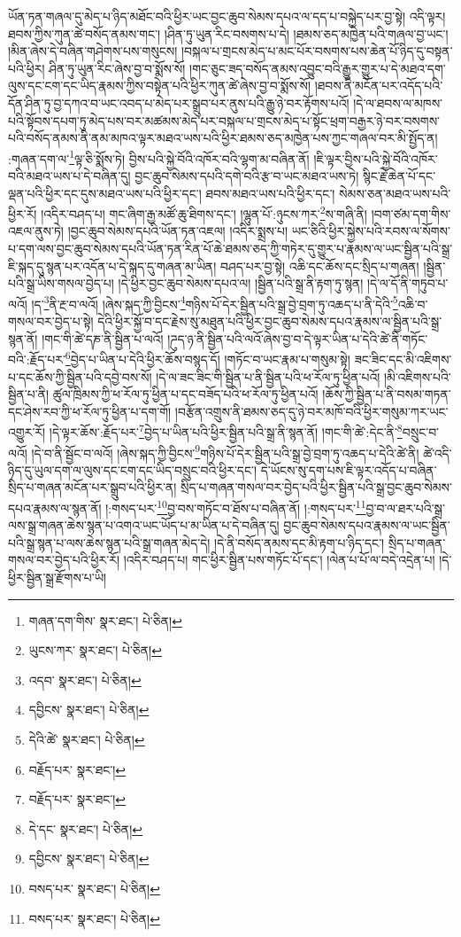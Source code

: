 ཡོན་ཏན་གཞལ་དུ་མེད་པ་ཉིད་མཐོང་བའི་ཕྱིར་ཡང་བྱང་ཆུབ་སེམས་དཔའ་ལ་དད་པ་བསྐྱེད་པར་བྱ་སྟེ། འདི་ལྟར། ཐབས་ཀྱིས་ཀུན་ཚེ་བསོད་ནམས་གང་། །ཤིན་ཏུ་ཡུན་རིང་བསགས་པ་དེ། །ཐམས་ཅད་མཁྱེན་པའི་གཞལ་བྱ་ཡང་། །མིན་ཞེས་དེ་བཞིན་གཤེགས་པས་གསུངས། །བསྐལ་པ་གྲངས་མེད་པ་མང་པོར་བསགས་པས་ཆེན་པོ་ཉིད་དུ་བསྟན་པའི་ཕྱིར། ཤིན་ཏུ་ཡུན་རིང་ཞེས་བྱ་བ་སྨོས་སོ། །གང་ཅུང་ཟད་བསོད་ནམས་འབྱུང་བའི་རྒྱུར་གྱུར་པ་དེ་མཐའ་དག་ལུས་དང་ངག་དང་ཡིད་རྣམས་ཀྱིས་བསྟེན་པའི་ཕྱིར་ཀུན་ཚེ་ཞེས་བྱ་བ་སྨོས་སོ། །ཐབས་ནི་མངོན་པར་འདོད་པའི་དོན་ཤིན་ཏུ་བྱ་དཀའ་བ་ཡང་འབད་པ་མེད་པར་སྒྲུབ་པར་ནུས་པའི་རྒྱུ་ཉེ་བར་རྟོགས་པའོ། །དེ་ལ་ཐབས་ལ་མཁས་པའི་སྟོབས་དཔག་ཏུ་མེད་པས་བར་མཚམས་མེད་པར་བསྐལ་པ་གྲངས་མེད་པ་སྟོང་ཕྲག་བརྒྱར་ཉེ་བར་བསགས་པའི་བསོད་ནམས་ནི་ནམ་མཁའ་ལྟར་མཐའ་ཡས་པའི་ཕྱིར་ཐམས་ཅད་མཁྱེན་པས་ཀྱང་གཞལ་བར་མི་སྤྱོད་ན། :གཞན་དག་ལ་\footnote{གཞན་དག་གིས་  སྣར་ཐང་།  པེ་ཅིན། }ལྟ་ཅི་སྨོས་ཏེ། བྱིས་པའི་སྐྱེ་བོའི་འཁོར་བའི་ལྷག་མ་བཞིན་ནོ། །ཇི་ལྟར་བྱིས་པའི་སྐྱེ་བོའི་འཁོར་བའི་མཐའ་ཡས་པ་དེ་བཞིན་དུ། བྱང་ཆུབ་སེམས་དཔའི་དགེ་བའི་རྩ་བ་ཡང་མཐའ་ཡས་ཏེ། སྙིང་རྗེ་ཆེན་པོ་དང་ལྡན་པའི་ཕྱིར་དང་དུས་མཐའ་ཡས་པའི་ཕྱིར་དང་། ཐབས་མཐའ་ཡས་པའི་ཕྱིར་དང་། སེམས་ཅན་མཐའ་ཡས་པའི་ཕྱིར་རོ། །འདིར་བཤད་པ། གང་ཞིག་རྒྱ་མཚོ་ཆུ་ཐིགས་དང་། །ལྷུན་པོ་:ཉུངས་ཀར་\footnote{ཡུངས་ཀར་  སྣར་ཐང་།  པེ་ཅིན། }ས་གཞི་ནི། །བག་ཙམ་དག་གིས་འཇལ་ནུས་ཏེ། །བྱང་ཆུབ་སེམས་དཔའི་ཡོན་ཏན་འཇལ། །འདིར་སྨྲས་པ། ཡང་ཅིའི་ཕྱིར་སྐྱེས་པའི་རབས་ལ་སོགས་པ་དག་ལས་བྱང་ཆུབ་སེམས་དཔའི་ཡོན་ཏན་རིན་པོ་ཆེ་ཐམས་ཅད་ཀྱི་གཏེར་དུ་གྱུར་པ་རྣམས་ལ་ཡང་སྦྱིན་པའི་སྒྲ་ཇི་སྐད་དུ་སྙན་པར་འདོན་པ་དེ་སྐད་དུ་གཞན་མ་ཡིན། བཤད་པར་བྱ་སྟེ། འཆི་དང་ཆོས་དང་སྲིད་པ་གཞན། །སྦྱིན་པའི་སྒྲ་ཡིས་གསལ་བྱེད་པ། །དེ་ཕྱིར་བྱང་ཆུབ་སེམས་དཔའ་ལ། །སྦྱིན་པའི་སྒྲ་ནི་རྟག་ཏུ་སྙན། །དེ་ལ་དོ་ནི་གཏུབ་པ་ལའོ། །ད་\footnote{འདབ་  སྣར་ཐང་།  པེ་ཅིན། }ནི་རྔ་བ་ལའོ། །ཞེས་སྐད་ཀྱི་བྱིངས་\footnote{དབྱིངས་  སྣར་ཐང་།  པེ་ཅིན། }གཉིས་པོ་དེར་སྦྱིན་པའི་སྒྲ་བྱེ་བྲག་ཏུ་འཆད་པ་ནི་དེའི་\footnote{དེའི་ཚེ་  སྣར་ཐང་།  པེ་ཅིན། }འཆི་བ་གསལ་བར་བྱེད་པ་སྟེ། དེའི་ཕྱིར་སྐྱོ་བ་དང་རྗེས་སུ་མཐུན་པའི་ཕྱིར་བྱང་ཆུབ་སེམས་དཔའ་རྣམས་ལ་སྦྱིན་པའི་སྒྲ་སྙན་ནོ། །གང་གི་ཚེ་དཎ་ནི་སྦྱིན་པ་ལའོ། །ཌུད་ཉ་ནི་སྦྱིན་པའི་ལའོ་ཞེས་བྱ་བ་དེ་ལྟར་ཡིན་པ་དེའི་ཚེ་ནི་གཏོང་བའི་:རྗོད་པར་\footnote{བརྗོད་པར་  སྣར་ཐང་། }བྱེད་པ་ཡིན་པ་དེའི་ཕྱིར་ཆོས་བསྙད་དོ། །གཏོང་བ་ཡང་རྣམ་པ་གསུམ་སྟེ། ཟང་ཟིང་དང་མི་འཇིགས་པ་དང་ཆོས་ཀྱི་སྦྱིན་པའི་དབྱེ་བས་སོ། །དེ་ལ་ཟང་ཟིང་གི་སྦྱིན་པ་ནི་སྦྱིན་པའི་ཕ་རོལ་ཏུ་ཕྱིན་པའོ། །མི་འཇིགས་པའི་སྦྱིན་པ་ནི། ཚུལ་ཁྲིམས་ཀྱི་ཕ་རོལ་ཏུ་ཕྱིན་པ་དང་བཟོད་པའི་ཕ་རོལ་ཏུ་ཕྱིན་པའོ། །ཆོས་ཀྱི་སྦྱིན་པ་ནི་བསམ་གཏན་དང་ཤེས་རབ་ཀྱི་ཕ་རོལ་ཏུ་ཕྱིན་པ་དག་གོ། །བརྩོན་འགྲུས་ནི་ཐམས་ཅད་དུ་ཉེ་བར་མཁོ་བའི་ཕྱིར་གསུམ་ཀར་ཡང་འགྱུར་རོ། །དེ་ལྟར་ཆོས་:རྗོད་པར་\footnote{བརྗོད་པར་  སྣར་ཐང་། }བྱེད་པ་ཡིན་པའི་ཕྱིར་སྦྱིན་པའི་སྒྲ་ནི་སྙན་ནོ། །གང་གི་ཚེ་:དེང་ནི་\footnote{དེ་དང་  སྣར་ཐང་།  པེ་ཅིན། }བསྲུང་བ་ལའོ། །དེ་བ་ནི་སྦྱོང་བ་ལའོ། །ཞེས་སྐད་ཀྱི་བྱིངས་\footnote{དབྱིངས་  སྣར་ཐང་།  པེ་ཅིན། }གཉིས་པོ་དེར་སྦྱིན་པའི་སྒྲ་བྱེ་བྲག་ཏུ་འཆད་པ་དེའི་ཚེ་ནི། ཚེ་འདི་ཉིད་དུ་ཡུལ་དག་ལ་ལུས་དང་ངག་དང་ཡིད་བསྲུང་བའི་ཕྱིར་དང་། དེ་ཡོངས་སུ་དག་པས་ཇི་ལྟར་འདོད་པ་བཞིན་སྲིད་པ་གཞན་མངོན་པར་སྒྲུབ་པའི་ཕྱིར་ན། སྲིད་པ་གཞན་གསལ་བར་བྱེད་པའི་ཕྱིར་སྦྱིན་པའི་སྒྲ་བྱང་ཆུབ་སེམས་དཔའ་རྣམས་ལ་སྙན་ནོ། །:གསད་པར་\footnote{བསད་པར་  སྣར་ཐང་།  པེ་ཅིན། }བྱ་བས་གཏོང་བ་ཐོས་པ་བཞིན་ནོ། །:གསད་པར་\footnote{བསད་པར་  སྣར་ཐང་།  པེ་ཅིན། }བྱ་བ་ལ་ཐར་པའི་སྒྲ་ལས་སྒྲ་གཞན་ཆེས་སྙན་པ་འགའ་ཡང་ཡོད་པ་མ་ཡིན་པ་དེ་བཞིན་དུ། བྱང་ཆུབ་སེམས་དཔའ་རྣམས་ལ་ཡང་སྦྱིན་པའི་སྒྲ་སྙན་པ་ལས་ཆེས་སྙན་པའི་སྒྲ་གཞན་མེད་དེ། །དེ་ནི་བསོད་ནམས་དང་མི་རྟག་པ་ཉིད་དང་། སྲིད་པ་གཞན་གསལ་བར་བྱེད་པའི་ཕྱིར་རོ། །འདིར་བཤད་པ། གང་ཕྱིར་སྦྱིན་པས་གཏོང་པོ་དང་། །ལེན་པ་པོ་ལ་བདེ་འདྲེན་པ། །དེ་ཕྱིར་སྦྱིན་སྒྲ་རྫོགས་པ་ཡི། 